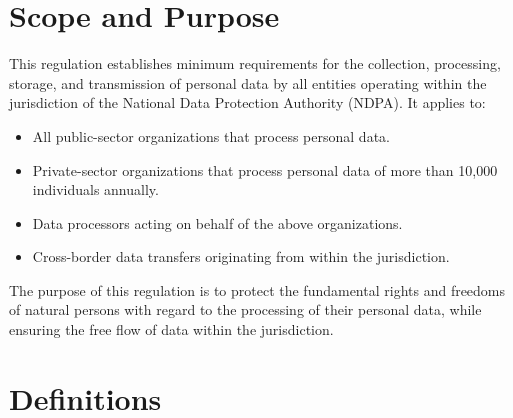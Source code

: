 \documentclass[
    language=english,
    doctype=article,
    institution=none,
]{../../omnilatex}
\begin{document}
\maketitle

\section{Scope and Purpose}

This regulation establishes minimum requirements for the collection,
processing, storage, and transmission of personal data by all entities
operating within the jurisdiction of the National Data Protection Authority
(NDPA). It applies to:

\begin{itemize}
    \item All public-sector organizations that process personal data.
    \item Private-sector organizations that process personal data of more
        than 10,000 individuals annually.
    \item Data processors acting on behalf of the above organizations.
    \item Cross-border data transfers originating from within the
        jurisdiction.
\end{itemize}

The purpose of this regulation is to protect the fundamental rights and
freedoms of natural persons with regard to the processing of their personal
data, while ensuring the free flow of data within the jurisdiction.

\section{Definitions}
\end{document}
